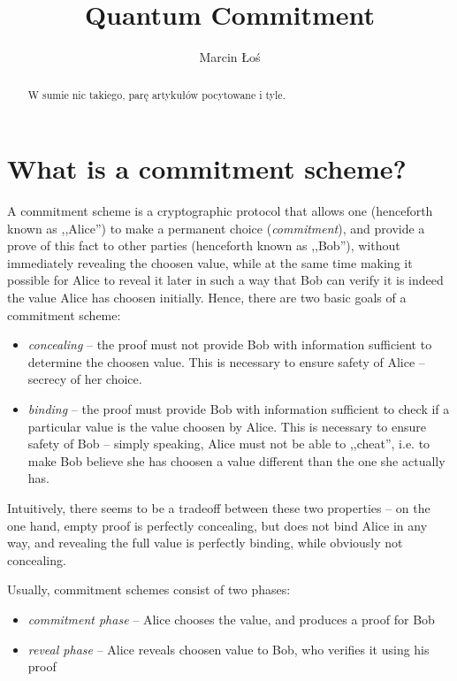 \documentclass[10pt]{article}
\begin{document}
\begin{opening}

\title{Quantum Commitment}
\author[AGH University of Science and Technology, los@student.agh.edu.pl]{Marcin Łoś}

\begin{abstract}
  W sumie nic takiego, parę artykułów pocytowane i tyle.
\end{abstract}


\end{opening}

\section{What is a commitment scheme?}

A commitment scheme is a cryptographic protocol that allows one (henceforth known as ,,Alice'') to make a
permanent choice (\emph{commitment}), and provide a prove of this fact to other parties (henceforth known
as ,,Bob''), without immediately revealing the choosen value, while at the same time making it possible 
for Alice to reveal it later in such a way that Bob can verify it is indeed the value Alice has choosen 
initially. Hence, there are two basic goals of a commitment scheme:

\begin{itemize}
  \item \emph{concealing} -- the proof must not provide Bob with information sufficient to determine the
    choosen value. This is necessary to ensure safety of Alice -- secrecy of her choice.
  \item \emph{binding} -- the proof must provide Bob with information sufficient to check if a particular
    value is the value choosen by Alice. This is necessary to ensure safety of Bob -- simply speaking,
    Alice must not be able to ,,cheat'', i.e. to make Bob believe she has choosen a value different than
    the one she actually has.
\end{itemize}

Intuitively, there seems to be a tradeoff between these two properties -- on the one hand, empty proof
is perfectly concealing, but does not bind Alice in any way, and revealing the full value is perfectly
binding, while obviously not concealing.


Usually, commitment schemes consist of two phases:

\begin{itemize}
  \item \emph{commitment phase} -- Alice chooses the value, and produces a proof for Bob
  \item \emph{reveal phase} -- Alice reveals choosen value to Bob, who verifies it using his proof
\end{itemize}
\end{document}
